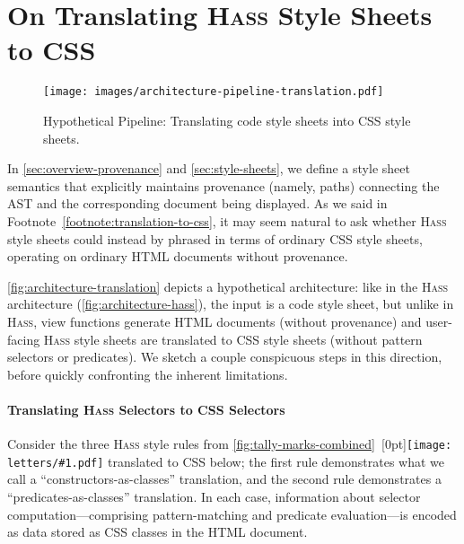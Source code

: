 \documentclass[acmsmall, screen]{acmart}
\newcommand{\parahead}[1]
  {\paragraph{\textbf{#1}}}
\newcommand{\hass}
{\textsc{Hass}}
\newcommand{\figBubble}[1]{\raisebox{-0.03in}[0pt]{\texttt{[image: letters/\#1.pdf]}}}
\newcommand{\refBubble}[1]
  {~\figBubble{#1}}
\begin{document}
\clearpage
\section{On Translating \hass{} Style Sheets to CSS}
\label{sec:translation-to-css}

\setlength\fboxsep{0pt}

\newcommand{\diffReplaceAdd}[1]
{\colorbox{blue!20}{#1}}
\newcommand{\diffSubtract}[1]{\colorbox{red!20}{#1}}
\newcommand{\diffReplace}[2]
  {\diffSubtract{#1}\hspace{0.02in}$\rightsquigarrow$\hspace{0.02in}\diffReplaceAdd{#2}}

\begin{wrapfigure}[12]{r}{2.3in}
  \vspace{-0.09in} \texttt{[image: images/architecture-pipeline-translation.pdf]}
  \caption{
  Hypothetical Pipeline: Translating code style sheets into CSS style sheets.
  }
  \label{fig:architecture-translation}
\end{wrapfigure}
 In \autoref{sec:overview-provenance} and \autoref{sec:style-sheets}, we define a style sheet semantics that explicitly maintains provenance (namely, paths) connecting the AST and the corresponding document being displayed.
As we said in Footnote~\ref{footnote:translation-to-css}, it may seem natural to ask whether \hass{} style sheets could instead by phrased in terms of ordinary CSS style sheets, operating on ordinary HTML documents without provenance.

\autoref{fig:architecture-translation} depicts a hypothetical architecture:
like in the \hass{} architecture (\autoref{fig:architecture-hass}), the input is a code style sheet, but
unlike in \hass{}, view functions generate HTML documents (without provenance) and user-facing \hass{} style sheets are translated to CSS style sheets (without pattern selectors or predicates).
We sketch a couple conspicuous steps in this direction, before quickly confronting the inherent limitations.


\parahead{Translating \hass{} Selectors to CSS Selectors}

Consider the three \hass{} style rules from \autoref{fig:tally-marks-combined}\refBubble{d} translated to CSS below;
the first rule demonstrates what we call a ``constructors-as-classes'' translation,
and the second rule demonstrates a ``predicates-as-classes'' translation.
In each case, information about selector computation---comprising pattern-matching and predicate evaluation---is encoded as data stored as CSS classes in the HTML document.
\end{document}
